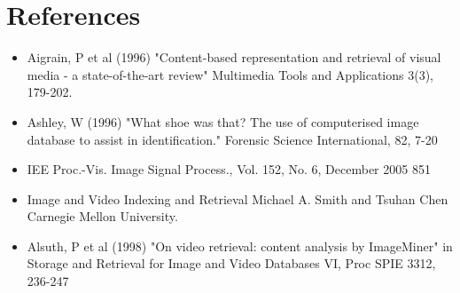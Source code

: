 \chapter{References}
\begin{itemize}
    \item Aigrain, P et al (1996) "Content-based representation and retrieval of visual media - a state-of-the-art review" Multimedia Tools and Applications 3(3), 179-202.
    \item Ashley, W (1996) "What shoe was that? The use of computerised image database to assist in identification." Forensic Science International, 82, 7-20
    \item IEE Proc.-Vis. Image Signal Process., Vol. 152, No. 6, December 2005 851
    \item Image and Video Indexing and Retrieval Michael A. Smith and Tsuhan Chen Carnegie Mellon University.
    \item Alsuth, P et al (1998) "On video retrieval: content analysis by ImageMiner" in Storage and Retrieval for Image and Video Databases VI, Proc SPIE 3312, 236-247

\end{itemize}